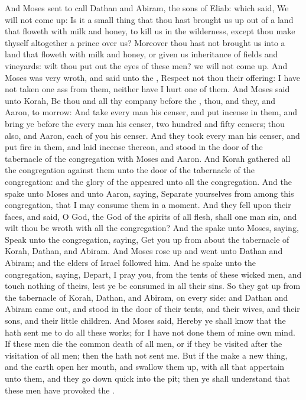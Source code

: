 \begin{biblechapter}
\verse And Moses sent to call Dathan and Abiram, the sons of Eliab: which said, We will not come up:
\verse Is it a small thing that thou hast brought us up out of a land that floweth with milk and honey, to kill us in the wilderness, except thou make thyself altogether a prince over us?
\verse Moreover thou hast not brought us into a land that floweth with milk and honey, or given us inheritance of fields and vineyards: wilt thou put out the eyes of these men? we will not come up.
\verse And Moses was very wroth, and said unto the \LORD, Respect not thou their offering: I have not taken one ass from them, neither have I hurt one of them.
\verse And Moses said unto Korah, Be thou and all thy company before the \LORD, thou, and they, and Aaron, to morrow:
\verse And take every man his censer, and put incense in them, and bring ye before the \LORD every man his censer, two hundred and fifty censers; thou also, and Aaron, each of you his censer.
\verse And they took every man his censer, and put fire in them, and laid incense thereon, and stood in the door of the tabernacle of the congregation with Moses and Aaron.
\verse And Korah gathered all the congregation against them unto the door of the tabernacle of the congregation: and the glory of the \LORD appeared unto all the congregation.
\verse And the \LORD spake unto Moses and unto Aaron, saying,
\verse Separate yourselves from among this congregation, that I may consume them in a moment.
\verse And they fell upon their faces, and said, O God, the God of the spirits of all flesh, shall one man sin, and wilt thou be wroth with all the congregation?
\verse And the \LORD spake unto Moses, saying,
\verse Speak unto the congregation, saying, Get you up from about the tabernacle of Korah, Dathan, and Abiram.
\verse And Moses rose up and went unto Dathan and Abiram; and the elders of Israel followed him.
\verse And he spake unto the congregation, saying, Depart, I pray you, from the tents of these wicked men, and touch nothing of theirs, lest ye be consumed in all their sins.
\verse So they gat up from the tabernacle of Korah, Dathan, and Abiram, on every side: and Dathan and Abiram came out, and stood in the door of their tents, and their wives, and their sons, and their little children.
\verse And Moses said, Hereby ye shall know that the \LORD hath sent me to do all these works; for I have not done them of mine own mind.
\verse If these men die the common death of all men, or if they be visited after the visitation of all men; then the \LORD hath not sent me.
\verse But if the \LORD make a new thing, and the earth open her mouth, and swallow them up, with all that appertain unto them, and they go down quick into the pit; then ye shall understand that these men have provoked the \LORD.

\end{biblechapter}
